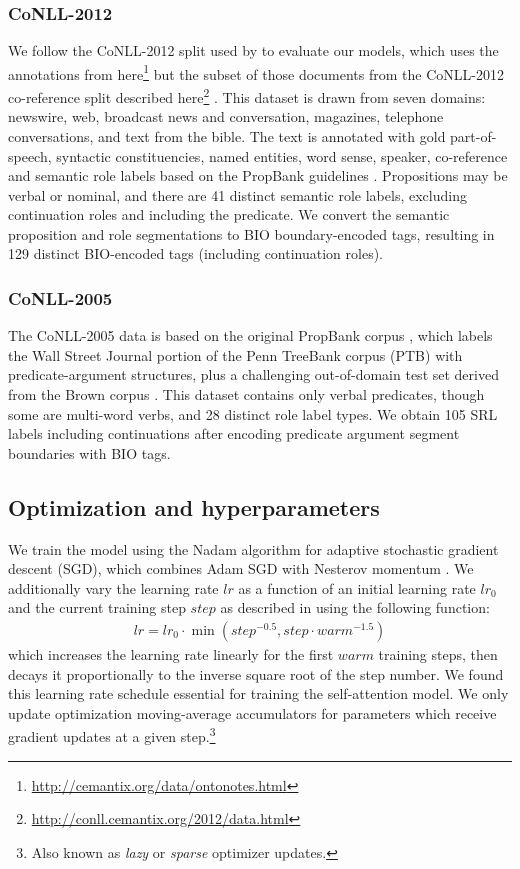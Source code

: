 \documentclass[11pt,a4paper]{article}
\begin{document}
\subsubsection{CoNLL-2012}
We follow the CoNLL-2012 split used by \citet{he2018jointly} to evaluate our models, which uses the annotations from here\footnote{\protect\url{http://cemantix.org/data/ontonotes.html}} but the subset of those documents from the CoNLL-2012 co-reference split described here\footnote{\protect\url{http://conll.cemantix.org/2012/data.html}} \citep{pradhan2013towards}. This dataset is drawn from seven domains: newswire, web, broadcast news and conversation, magazines, telephone conversations, and text from the bible. The text is annotated with gold part-of-speech, syntactic constituencies, named entities, word sense, speaker, co-reference and semantic role labels based on the PropBank guidelines \citep{palmer2005proposition}. Propositions may be verbal or nominal, and there are 41 distinct semantic role labels, excluding continuation roles and including the predicate. We convert the semantic proposition and role segmentations to BIO boundary-encoded tags, resulting in 129 distinct BIO-encoded tags (including continuation roles). 

\subsubsection{CoNLL-2005}
The CoNLL-2005 data \citep{carreras2005introduction} is based on the original PropBank corpus \citep{palmer2005proposition}, which labels the Wall Street Journal portion of the Penn TreeBank corpus (PTB) \citep{marcus1993building} with predicate-argument structures, plus a challenging out-of-domain test set derived from the Brown corpus \citep{francis1964manual}. This dataset contains only verbal predicates, though some are multi-word verbs, and 28 distinct role label types. We obtain 105 SRL labels including continuations after encoding predicate argument segment boundaries with BIO tags.

\subsection{Optimization and hyperparameters}
We train the model using the Nadam \citep{dozat2016incorporating} algorithm for adaptive stochastic gradient descent (SGD), which combines Adam \citep{kingma2014adam} SGD with Nesterov momentum \citep{nesterov1983method}. We additionally vary the learning rate $lr$ as a function of an initial learning rate $lr_0$ and the current training step $step$ as described in \citet{vaswani2017attention} using the following function:
\begin{align}
lr = lr_0 \cdot \min(step^{-0.5},  step\cdot warm^{-1.5})
\end{align}
which increases the learning rate linearly for the first $warm$ training steps, then decays it proportionally to the inverse square root of the step number. We found this learning rate schedule essential for training the self-attention model. We only update optimization moving-average accumulators for parameters which receive gradient updates at a given step.\footnote{Also known as \emph{lazy} or \emph{sparse} optimizer updates.}
\end{document}
